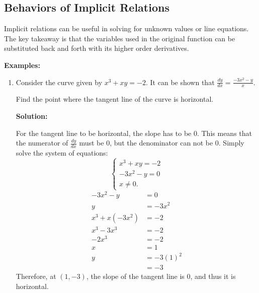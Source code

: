 \documentclass[12pt]{article}
\begin{document}
        \subsection{Behaviors of Implicit Relations} %
            Implicit relations can be useful in solving for unknown values or line equations. The key takeaway is that the variables used in the original function can be substituted back and forth with its higher order derivatives.

            \noindent \textbf{Examples:}
            \begin{enumerate}
                \item Consider the curve given by $x^3 + xy = -2$. It can be shown that $\frac{dy}{dx} = \frac{-3x^2 - y}{x}$.

                Find the point where the tangent line of the curve is horizontal.
                \bigskip

                \textbf{Solution:}

                For the tangent line to be horizontal, the slope has to be $0$. This means that the numerator of $\frac{dy}{dx}$ must be $0$, but the denominator can not be $0$. Simply solve the system of equations:
                \[ \begin{cases}
                    x^3 + xy = -2 \\
                    -3x^2 - y = 0 \\
                    x \ne 0.
                \end{cases} \]
                \begin{align*}
                    -3x^2 - y &= 0 \\
                    y &= -3x^2 \\[6pt]
                    x^3 + x(-3x^2) &= -2 \\
                    x^3 - 3x^3 &= -2 \\
                    -2x^3 &= -2 \\
                    x &= 1 \\[6pt]
                    y &= -3(1)^2 \\
                    &= -3
                \end{align*}
                Therefore, at $(1, -3)$, the slope of the tangent line is $0$, and thus it is horizontal.
            \end{enumerate}
\end{document}
